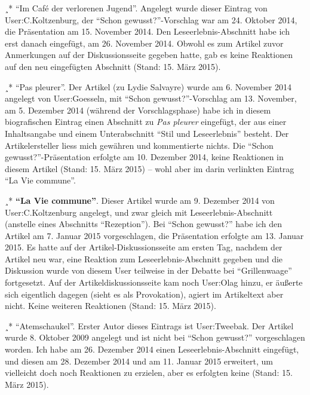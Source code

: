\documentclass[fontsize=12pt]{scrartcl}
\begin{document}
¸* "`Im Caf\'{e} der verlorenen Jugend"'. Angelegt wurde dieser Eintrag von \mbox{User}:C.Kolt\-zenburg, der "`Schon gewusst?"'-Vorschlag war am 24. Oktober 2014, die Pr\"asentation am 15. November 2014. Den Leseerlebnis-Abschnitt habe ich erst danach eingef\"ugt, am 26. November 2014. Obwohl es zum Artikel zuvor Anmerkungen auf der Dis\-kus\-si\-onsseite gegeben hatte, gab es keine Reaktionen auf den neu eingef\"ugten Abschnitt (Stand: 15. M\"arz 2015).

¸* "`Pas pleurer"'. Der Artikel (zu Lydie Salvayre) wurde am 6. November 2014 angelegt von \mbox{User}:Goesseln, mit "`Schon gewusst?"'-Vorschlag am 13. November, am 5. Dezember 2014 (w\"ahrend der Vorschlagsphase) habe ich in diesem biografischen Eintrag einen Abschnitt zu \textit{Pas pleurer} eingef\"ugt, der aus einer Inhaltsangabe und einem Unterabschnitt "`Stil und Leseerlebnis"' be\-steht. Der Artikelersteller\textsuperscript{\tiny *} liess mich gew\"ahren und kommentierte nichts. Die "`Schon gewusst?"'-Pr\"asentation erfolgte am 10. Dezember 2014, keine Reaktionen in diesem Artikel (Stand: 15. M\"arz 2015) -- wohl aber im darin verlinkten Eintrag "`La Vie commune"'.

¸* \textbf{"`La Vie commune"'}. Dieser Artikel wurde am 9. Dezember 2014 von \mbox{User}:C.Kolt\-zenburg angelegt, und zwar gleich mit Leseerlebnis-Abschnitt (anstelle eines Ab\-schnitts "`Re\-zep\-tion"'). Bei "`Schon gewusst?"' habe ich den Artikel am 7. Januar 2015 vorgeschlagen, die Pr\"asentation erfolgte am 13. Januar 2015. Es hatte auf der Artikel-Dis\-kus\-si\-ons\-sei\-te am ersten Tag, nachdem der Artikel neu war, eine Reaktion zum Leseerlebnis-Abschnitt gegeben und die Dis\-kus\-si\-on wurde von diesem \mbox{User} teilweise in der Debatte bei "`Grillenwaage"' fortgesetzt. Auf der Artikeldis\-kus\-si\-onsseite kam noch \mbox{User}:Olag hinzu, er \"au{\ss}erte sich eigentlich dagegen (sieht es als Provokation), agiert im Artikeltext aber nicht. Keine weiteren Reaktionen (Stand: 15. M\"arz 2015).

¸* "`Atemschaukel"'. Erster Autor\textsuperscript{\tiny *} dieses Eintrags ist \mbox{User}:Tweebak. Der Artikel wurde 8. Oktober 2009‎ angelegt und ist nicht bei "`Schon gewusst?"' vorgeschlagen worden. Ich habe am 26. Dezember 2014 einen Leseerlebnis-Abschnitt eingef\"ugt, und diesen am 28. Dezember 2014 und am 11. Januar 2015 erweitert, um vielleicht doch noch Reaktionen zu erzielen, aber es erfolgten keine (Stand: 15. M\"arz 2015).
\end{document}
